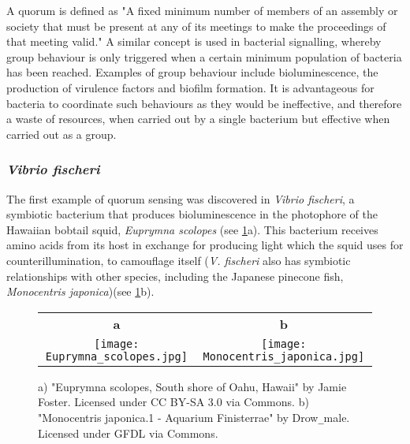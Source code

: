 A quorum is defined as "A fixed minimum number of members of an assembly or society that must be present at any of its meetings to make the proceedings of that meeting valid." \cite{Dictionary}  
A similar concept is used in bacterial signalling, whereby group behaviour is only triggered when a certain minimum population of bacteria has been reached. Examples of group behaviour include bioluminescence, the  production  of  virulence  factors  and  biofilm  formation.  
It is advantageous for bacteria to coordinate such behaviours as they would be ineffective, and therefore a waste of resources, when carried out by a single bacterium but effective when carried out as a group.

\subsubsection{\textit{Vibrio fischeri}}

The first example of quorum sensing was discovered in \textit{Vibrio fischeri}, a symbiotic bacterium that produces bioluminescence in the photophore of the Hawaiian bobtail squid, \textit{Euprymna scolopes} \cite{Nealson1970a,Miller2001,Visick2006} (see \ref{fig:ES+MJ}a). This bacterium receives amino acids\cite{Graf1998, Lemus2000} from its host in exchange for producing light which the squid uses for counterillumination, to camouflage itself\cite{Jones2004} (\textit{V. fischeri} also has symbiotic relationships with other species, including the Japanese pinecone fish, \textit{Monocentris japonica}\cite{Ruby1976})(see \ref{fig:ES+MJ}b). 

\begin{figure}[H]
	\begin{center}
		\begin{tabular}{cc}
	    	\textbf{a} & \textbf{b}\\
			\texttt{[image: Euprymna\_scolopes.jpg]} & \texttt{[image: Monocentris\_japonica.jpg]} \\
			
		\end{tabular}	
		
		\caption{a) "Euprymna scolopes, South shore of Oahu, Hawaii" by Jamie Foster. Licensed under CC BY-SA 3.0 via Commons. 
		b) "Monocentris japonica.1 - Aquarium Finisterrae" by Drow\texttt{\_}male. Licensed under GFDL via Commons. \label{fig:ES+MJ}}
		
	\end{center}
\end{figure}



